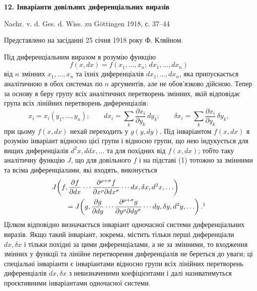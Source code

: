 \documentclass[11pt]{article}
\begin{document}

\begin{center}
{\Large\bfseries 12. Інваріанти довільних диференціальних виразів}\par
\vspace{1.5em}
Nachr. v. d. Ges. d. Wiss. zu Göttingen 1918, с. 37--44
\end{center}

\vspace{3em}
\begin{center}
Представлено на засіданні 25 січня 1918 року Ф. Кляйном.
\end{center}

Під диференціальним виразом я розумію функцію
\[
f(x,dx)=f(x_1,\ldots,x_n;\,dx_1,\ldots,dx_n)
\]
від \(n\) змінних \(x_1,\ldots,x_n\) та їхніх диференціалів
\(dx_1,\ldots,dx_n\), яка припускається аналітичною в обох системах по
\(n\) аргументів, але не обов'язково дійсною. Тепер за основу я беру групу всіх аналітичних перетворень змінних, якій відповідає група всіх лінійних перетворень диференціалів:
\begin{equation}
x_i=x_i(y_1,\ldots,y_n);\qquad
dx_i=\sum_k\frac{\partial x_i}{\partial y_k}\,dy_k;\qquad
\delta x_i=\sum_k\frac{\partial x_i}{\partial y_k}\,\delta y_k,
\tag{1}
\end{equation}
при цьому \(f(x,dx)\) нехай переходить у \(g(y,dy)\). Під інваріантом \(f(x,dx)\) я розумію інваріант відносно цієї групи і відносно групи, що нею індукується для вищих диференціалів \(d^2x,ddx,\ldots\) та для похідних від \(f(x,dx)\); тобто таку аналітичну функцію \(J\), що для довільного \(f\) і на підставі (1) тотожно за змінними та всіма диференціалами, які входять, виконується
\[
\begin{aligned}
&J\!\left(f,\frac{\partial f}{\partial dx}\cdots
\frac{\partial^{\rho+\sigma}f}{\partial x^\rho\partial dx^\sigma}
\cdots dx,\delta x,d^2x,\ldots\right)\\
&\qquad =
J\!\left(g,\frac{\partial g}{\partial dy}\cdots
\frac{\partial^{\rho+\sigma}g}{\partial y^\rho\partial dy^\sigma}
\cdots dy,\delta y,d^2y,\ldots\right).\footnotemark
\end{aligned}
\]
Цілком відповідно визначається інваріант одночасної системи диференціальних виразів. Якщо такий інваріант, зокрема, містить тільки перші диференціали \(dx,\delta x\) і тільки похідні за цими диференціалами, а не за змінними, то входження змінних у функції та лінійне перетворення диференціалів не береться до уваги; ці спеціальні інваріанти є інваріантами відносно групи всіх лінійних перетворень диференціалів \(dx,\delta x\) з невизначеними коефіцієнтами і далі називатимуться проєктивними інваріантами одночасної системи.
\end{document}
